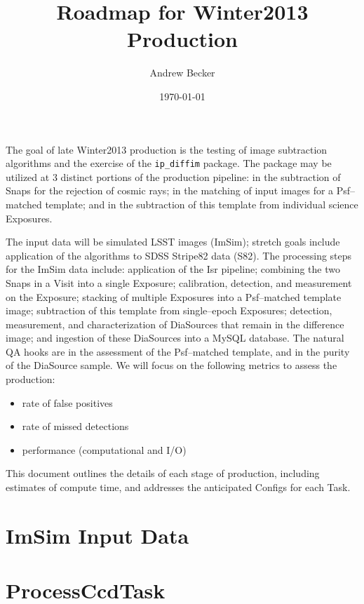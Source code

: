 \documentclass[12pt]{article}
\author{Andrew Becker}
\title{Roadmap for Winter2013 Production}
\date{\today}
\begin{document}
\maketitle

The goal of late Winter2013 production is the testing of image
subtraction algorithms and the exercise of the {\tt ip\_diffim}
package.  The package may be utilized at 3 distinct portions of the
production pipeline: in the subtraction of Snaps for the rejection of
cosmic rays; in the matching of input images for a Psf--matched
template; and in the subtraction of this template from individual
science Exposures.

The input data will be simulated LSST images (ImSim); stretch goals
include application of the algorithms to SDSS Stripe82 data (S82).
The processing steps for the ImSim data include: application of the
Isr pipeline; combining the two Snaps in a Visit into a single
Exposure; calibration, detection, and measurement on the Exposure;
stacking of multiple Exposures into a Psf--matched template image;
subtraction of this template from single--epoch Exposures; detection,
measurement, and characterization of DiaSources that remain in the
difference image; and ingestion of these DiaSources into a MySQL
database.  The natural QA hooks are in the assessment of the
Psf--matched template, and in the purity of the DiaSource sample.  We
will focus on the following metrics to assess the production:
\begin{itemize}
\item rate of false positives
\item rate of missed detections
\item performance (computational and I/O)
\end{itemize}
This document outlines the details of each stage of production,
including estimates of compute time, and addresses the anticipated
Configs for each Task.

\clearpage
\tableofcontents
\clearpage


\clearpage 
\section{ImSim Input Data} 


\clearpage 
\section{ProcessCcdTask} 
\end{document}
